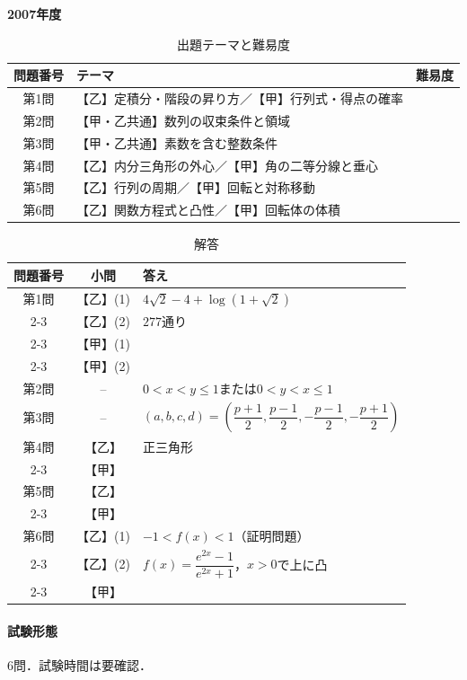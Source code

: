 \documentclass[../../main.tex]{subfiles}
\begin{document}
\begin{center}
  {\fontsize{48pt}{58pt}\selectfont \textbf{2007}\normalsize\textbf{年度}}
\end{center}

\begin{table}[htb]
  \centering
  \caption{出題テーマと難易度}
  \begin{tabular}{|c|p{9cm}|c|}
    \hline
    \textbf{問題番号} & \textbf{テーマ} & \textbf{難易度} \\
    \hline
    第1問 & 【乙】定積分・階段の昇り方／【甲】行列式・得点の確率 & \\
    \hline
    第2問 & 【甲・乙共通】数列の収束条件と領域 & \\
    \hline
    第3問 & 【甲・乙共通】素数を含む整数条件 & \\
    \hline
    第4問 & 【乙】内分三角形の外心／【甲】角の二等分線と垂心 & \\
    \hline
    第5問 & 【乙】行列の周期／【甲】回転と対称移動 & \\
    \hline
    第6問 & 【乙】関数方程式と凸性／【甲】回転体の体積 & \\
    \hline
  \end{tabular}
\end{table}

\begin{table}[htb]
  \centering
  \caption{解答}
  \renewcommand{\arraystretch}{1.4}
  \begin{tabular}{|c|c|p{9cm}|}
    \hline
    \textbf{問題番号} & \textbf{小問} & \textbf{答え} \\
    \hline
    第1問 & 【乙】(1) & $4\sqrt{2}-4+\log(1+\sqrt{2})$ \\
    \cline{2-3}
    & 【乙】(2) & $277$通り \\
    \cline{2-3}
    & 【甲】(1) &  \\
    \cline{2-3}
    & 【甲】(2) &  \\
    \hline
    第2問 & -- & $0<x<y\le1$または$0<y<x\le1$ \\
    \hline
    第3問 & -- & $(a,b,c,d)=\left(\dfrac{p+1}{2},\dfrac{p-1}{2},-\dfrac{p-1}{2},-\dfrac{p+1}{2}\right)$ \\
    \hline
    第4問 & 【乙】 & 正三角形 \\
    \cline{2-3}
    & 【甲】 &  \\
    \hline
    第5問 & 【乙】 &  \\
    \cline{2-3}
    & 【甲】 &  \\
    \hline
    第6問 & 【乙】(1) & $-1<f(x)<1$（証明問題） \\
    \cline{2-3}
    & 【乙】(2) & $f(x)=\dfrac{e^{2x}-1}{e^{2x}+1}$，$x>0$で上に凸 \\
    \cline{2-3}
    & 【甲】 &  \\
    \hline
  \end{tabular}
\end{table}

\paragraph{試験形態}
6問．試験時間は要確認．
\end{document}
